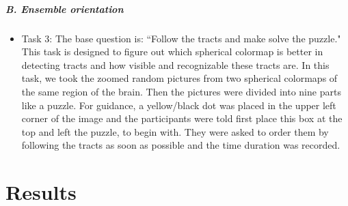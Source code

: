 \documentclass[a4paper, 12pt]{report}
\begin{document}
\paragraph{B. Ensemble orientation}

\begin{itemize}
\item{Task 3:} The base question is: ``Follow the tracts and make solve the puzzle."
This task is designed to figure out which spherical colormap is better in detecting tracts and how visible and recognizable these tracts are. In this task, we took the zoomed random pictures from two spherical colormaps of the same region of the brain. Then the pictures were divided into nine parts like a puzzle. For guidance, a yellow/black dot was placed in the upper left corner of the image and the participants were told first place this box at the top and left the puzzle, to begin with. They were asked to order them by following the tracts as soon as possible and the time duration was recorded. 

\end{itemize}

\chapter{Results}


\end{document}
